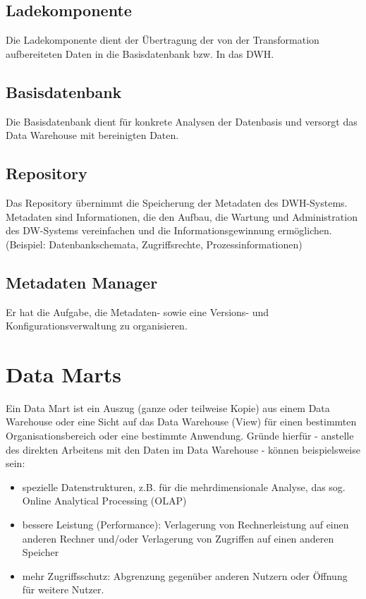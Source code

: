 \subsection{Ladekomponente}

Die Ladekomponente dient der Übertragung der von der Transformation aufbereiteten Daten in die Basisdatenbank bzw. In das DWH.

\subsection{Basisdatenbank}

Die Basisdatenbank dient für konkrete Analysen der Datenbasis und versorgt das Data Warehouse mit bereinigten Daten. 

\subsection{Repository}

Das Repository übernimmt die Speicherung der Metadaten des DWH-Systems. Metadaten sind Informationen, die den Aufbau, die Wartung und Administration des DW-Systems vereinfachen und die Informationsgewinnung ermöglichen. (Beispiel: Datenbankschemata, Zugriffsrechte, Prozessinformationen)

\subsection{Metadaten Manager}

Er hat die Aufgabe, die Metadaten- sowie eine Versions- und Konfigurationsverwaltung zu organisieren.

\section{Data Marts}

Ein Data Mart ist ein Auszug (ganze oder teilweise Kopie) aus einem Data Warehouse oder eine Sicht auf das Data Warehouse (View) für einen bestimmten Organisationsbereich oder eine bestimmte Anwendung.
Gründe hierfür - anstelle des direkten Arbeitens mit den Daten im Data Warehouse - können beispielsweise sein:
\begin{itemize}
    \item spezielle Datenstrukturen, z.B. für die mehrdimensionale Analyse, das sog. Online Analytical Processing (OLAP)
    \item bessere Leistung (Performance): Verlagerung von Rechnerleistung auf einen anderen Rechner und/oder Verlagerung von Zugriffen auf einen anderen Speicher
    \item mehr Zugriffsschutz: Abgrenzung gegenüber anderen Nutzern oder Öffnung für weitere Nutzer.
\end{itemize}

